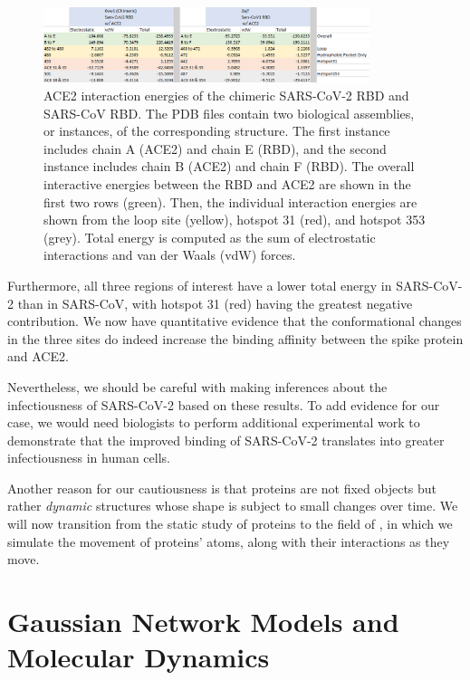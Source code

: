 \begin{figure}[h]
	\centering
	\mySfFamily
	\includegraphics[width = 0.85\textwidth]{../images/NAMDEnergy2.png}
	\caption{ACE2 interaction energies of the chimeric SARS-CoV-2 RBD and SARS-CoV RBD. The PDB files contain two biological assemblies, or instances, of the corresponding structure. The first instance includes chain A (ACE2) and chain E (RBD), and the second instance includes chain B (ACE2) and chain F (RBD). The overall interactive energies between the RBD and ACE2 are shown in the first two rows (green). Then, the individual interaction energies are shown from the loop site (yellow), hotspot 31 (red), and hotspot 353 (grey). Total energy is computed as the sum of electrostatic interactions and van der Waals (vdW) forces.}
	\label{fig:NAMDEnergy2}
\end{figure}

Furthermore, all three regions of interest have a lower total energy in SARS-CoV-2 than in SARS-CoV, with hotspot 31 (red) having the greatest negative contribution. We now have quantitative evidence that the conformational changes in the three sites do indeed increase the binding affinity between the spike protein and ACE2.

Nevertheless, we should be careful with making inferences about the infectiousness of SARS-CoV-2 based on these results. To add evidence for our case, we would need biologists to perform additional experimental work to demonstrate that the improved binding of SARS-CoV-2 translates into greater infectiousness in human cells.

Another reason for our cautiousness is that proteins are not fixed objects but rather \textit{dynamic} structures whose shape is subject to small changes over time. We will now transition from the static study of proteins to the field of , in which we simulate the movement of proteins' atoms, along with their interactions as they move.\\

\FloatBarrier
{}

\section{Gaussian Network Models and Molecular Dynamics}
\label{sec:gaussian_network_models}
